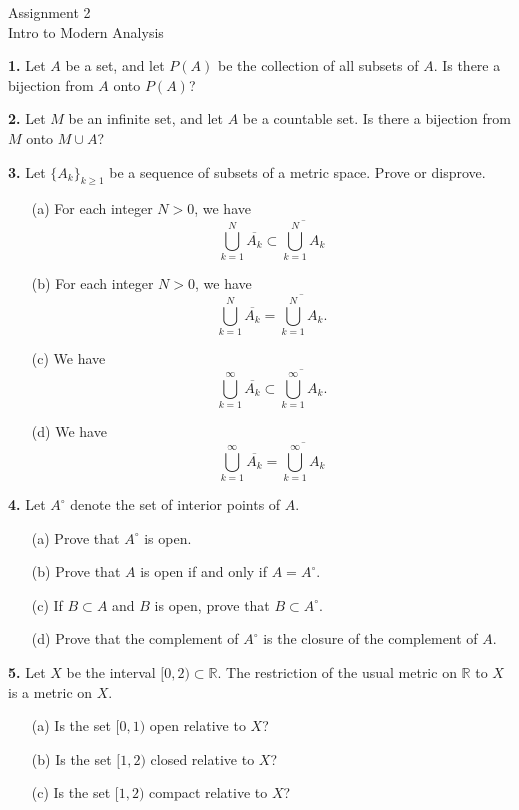 \documentclass[12pt]{article}
\begin{document}
\begin{center}
Assignment 2\\
Intro to Modern Analysis
\end{center}


\noindent \textbf{1.} Let $A$ be a set, and let $P(A)$ be the collection of all subsets of $A$. Is there a bijection from $A$ onto $P(A)$? 

\medskip

\noindent \textbf{2.} Let $M$ be an infinite set, and let $A$ be a countable set. Is there a bijection from $M$ onto $M \cup A$? 

\medskip 

\noindent \textbf{3.} Let $\{A_k\}_{k \geqslant 1}$ be a sequence of subsets of a metric space. Prove or disprove. 
\begin{enumerate}
\item[(a)] For each integer $N > 0$, we have 
\[
\bigcup_{k=1}^N \overline{A_k} \subset \overline{\bigcup_{k=1}^N A_k} 
\]
\item[(b)] For each integer $N > 0$, we have 
\[
\bigcup_{k=1}^N \overline{A_k} = \overline{\bigcup_{k=1}^N A_k}.
\]
\item[(c)] We have 
\[
\bigcup_{k=1}^\infty \overline{A_k} \subset \overline{\bigcup_{k=1}^\infty A_k}.
\]
\item[(d)] We have 
\[
\bigcup_{k=1}^\infty \overline{A_k} = \overline{\bigcup_{k=1}^\infty A_k} 
\]
\end{enumerate}

\medskip

\noindent \textbf{4.} Let $A^\circ$ denote the set of interior points of $A$. 
\begin{enumerate}
\item[(a)] Prove that $A^\circ$ is open. 
\item[(b)] Prove that $A$ is open if and only if $A = A^\circ$. 
\item[(c)] If $B \subset A$ and $B$ is open, prove that $B \subset A^\circ$. 
\item[(d)] Prove that the complement of $A^\circ$ is the closure of the complement of $A$. 
\end{enumerate}

\medskip

\noindent \textbf{5.} Let $X$ be the interval $[0,2) \subset \mathbb{R}$. The restriction of the usual metric on $\mathbb{R}$ to $X$ is a metric on $X$. 
\begin{enumerate}
\item[(a)] Is the set $[0,1)$ open relative to $X$? 
\item[(b)] Is the set $[1,2)$ closed relative to $X$?
\item[(c)] Is the set $[1,2)$ compact relative to $X$?
\end{enumerate}
\end{document}
